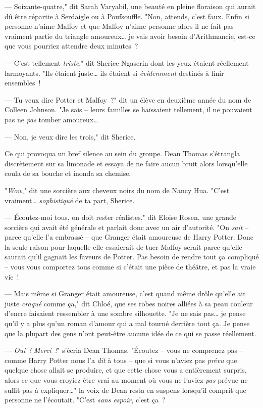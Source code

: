--- Soixante-quatre," dit Sarah Varyabil, une beauté en pleine floraison qui aurait dû être répartie à Serdaigle ou à Poufsouffle. "Non, attends, c'est faux. Enfin si personne n'aime Malfoy et que Malfoy n'aime personne alors il ne fait pas vraiment partie du triangle amoureux… je vais avoir besoin d'Arithmancie, est-ce que vous pourriez attendre deux minutes~?

--- C'est tellement \emph{triste}," dit Sherice Ngaserin dont les yeux étaient réellement larmoyants. "Ils étaient juste… ils étaient si \emph{évidemment} destinés à finir ensembles~!

--- Tu veux dire Potter et Malfoy~?" dit un élève en deuxième année du nom de Colleen Johnson. "Je sais -- leurs familles se haïssaient tellement, il ne pouvaient pas ne \emph{pas} tomber amoureux…

--- Non, je veux dire les trois," dit Sherice.

Ce qui provoqua un bref silence au sein du groupe. Dean Thomas s'étrangla discrètement sur sa limonade et essaya de ne faire aucun bruit alors lorsqu'elle coula de sa bouche et inonda sa chemise.

"\emph{Wow}," dit une sorcière aux cheveux noirs du nom de Nancy Hua. "C'est vraiment… \emph{sophistiqué} de ta part, Sherice.

--- Écoutez-moi tous, on doit rester réalistes," dit Eloise Rosen, une grande sorcière qui avait été générale et parlait donc avec un air d'autorité. "On \emph{sait} -- parce qu'elle l'a embrassé -- que Granger était amoureuse de Harry Potter. Donc la seule raison pour laquelle elle essaierait de tuer Malfoy serait parce qu'elle saurait qu'il gagnait les faveurs de Potter. Pas besoin de rendre tout ça compliqué -- vous vous comportez tous comme si c'était une pièce de théâtre, et pas la vraie vie~!

--- Mais même si Granger était amoureuse, c'est quand même drôle qu'elle ait juste \emph{craqué} comme ça," dit Chloé, que ses robes noires alliées à sa peau couleur d'encre faisaient ressembler à une sombre silhouette. "Je ne sais pas… je pense qu'il y a plus qu'un roman d'amour qui a mal tourné derrière tout ça. Je pense que la plupart des gens n'ont peut-être aucune idée de ce qui se passe réellement.

--- \emph{Oui~! Merci~!}" s'écria Dean Thomas. "Écoutez -- vous ne comprenez pas -- comme Harry Potter nous l'a \emph{dit} à tous -- que si vous n'aviez pas \emph{prévu} que quelque chose allait se produire, et que cette chose vous a entièrement surpris, alors ce que vous croyiez être vrai au moment où vous ne l'aviez \emph{pas} prévue ne suffit pas à expliquer…" la voix de Dean resta en suspens lorsqu'il comprit que personne ne l'écoutait. "C'est \emph{sans espoir}, c'est ça~?

